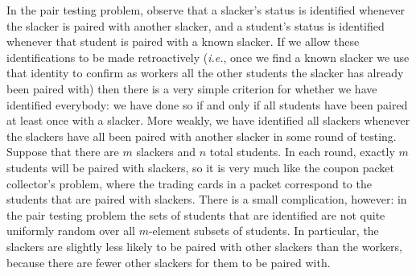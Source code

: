 \documentclass[11pt]{llncs}
\begin{document}
In the pair testing problem, observe that a
slacker's status is identified whenever the slacker is paired with another
slacker, and a student's status is identified whenever that student is
paired with a known slacker. If we allow these identifications to be made
retroactively ({\em i.e.}, once we find a known slacker we use that identity to
confirm as workers all the other students the slacker has already been
paired with) then there is a very simple criterion for whether
we have identified everybody: we have done so if and only if all students have been
paired at least once with a slacker. More weakly, we have identified all
slackers whenever the slackers have all been paired with another slacker in
some round of testing. Suppose that there are $m$ slackers and $n$ total
students. In each round, exactly $m$ students will be paired with slackers, so
it is very much like the coupon packet collector's problem, where the
trading cards in a packet correspond to the students that are paired with
slackers. There is a small complication, however: in the pair testing
problem the sets of students that are identified are not quite uniformly
random over all $m$-element subsets of students. In particular, the slackers
are slightly less likely to be paired with other slackers than the workers, because there
are fewer other slackers for them to be paired with.
\end{document}
